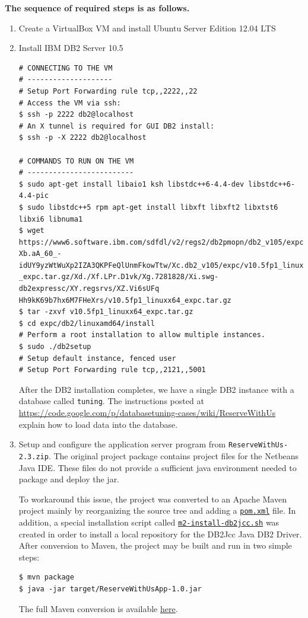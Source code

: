 \documentclass[letterpaper]{article}%
\begin{document}
\textbf{The sequence of required steps is as follows.}
\begin{enumerate}
  \item Create a VirtualBox VM and install Ubuntu Server Edition 12.04 LTS

  \item Install IBM DB2 Server 10.5
    \begin{Verbatim}
# CONNECTING TO THE VM
# --------------------
# Setup Port Forwarding rule tcp,,2222,,22
# Access the VM via ssh:
$ ssh -p 2222 db2@localhost
# An X tunnel is required for GUI DB2 install:
$ ssh -p -X 2222 db2@localhost

# COMMANDS TO RUN ON THE VM
# -------------------------
$ sudo apt-get install libaio1 ksh libstdc++6-4.4-dev libstdc++6-4.4-pic
$ sudo libstdc++5 rpm apt-get install libxft libxft2 libxtst6 libxi6 libnuma1
$ wget https://www6.software.ibm.com/sdfdl/v2/regs2/db2pmopn/db2_v105/expc/Xa.2/
Xb.aA_60_-idUY9yzWtWuXp2IZA3QKPFeQlUnmFkowTtw/Xc.db2_v105/expc/v10.5fp1_linuxx64
_expc.tar.gz/Xd./Xf.LPr.D1vk/Xg.7281828/Xi.swg-db2expressc/XY.regsrvs/XZ.Vi6sUFq
Hh9kK69b7hx6M7FHeXrs/v10.5fp1_linuxx64_expc.tar.gz
$ tar -zxvf v10.5fp1_linuxx64_expc.tar.gz
$ cd expc/db2/linuxamd64/install
# Perform a root installation to allow multiple instances.
$ sudo ./db2setup
# Setup default instance, fenced user
# Setup Port Forwarding rule tcp,,2121,,5001
    \end{Verbatim}

    After the DB2 installation completes, we have a single DB2 instance with a
    database called \texttt{tuning}. The instructions posted at
    \url{https://code.google.com/p/databasetuning-cases/wiki/ReserveWithUs}
    explain how to load data into the database.

  \item Setup and configure the application server program from
    \texttt{ReserveWithUs-2.3.zip}. The original project package contains
    project files for the Netbeans Java IDE. These files do not provide a
    sufficient java environment needed to package and deploy the \RWUApp{} jar.

    To workaround this issue, the \RWUApp{} project was converted to an Apache
    Maven project mainly by reorganizing the source tree and adding a
    \href{%
      https://github.com/blr246/adbs-reservewithus/blob/master/ReserveWithUsApp/pom.xml%
    }{\texttt{pom.xml}}
    file. In addition, a special installation script called
    \href{%
      https://github.com/blr246/adbs-reservewithus/blob/master/ReserveWithUsApp/m2-install-db2jcc.sh%
    }{\texttt{m2-install-db2jcc.sh}} was created in order to install a local
    repository for the DB2Jcc Java DB2 Driver. After conversion to Maven, the
    project may be built and run in two simple steps:
    \begin{Verbatim}
$ mvn package
$ java -jar target/ReserveWithUsApp-1.0.jar
    \end{Verbatim}

    The full Maven conversion is available
    \href{%
      https://github.com/blr246/adbs-reservewithus/commit/%
      fd68b867a8dd5a7cb88058cf4a24ca59dd8575eb%
    }{here}.
\end{enumerate}
\end{document}
